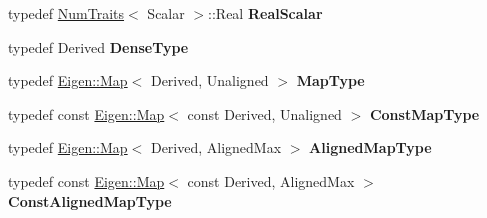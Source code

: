 \begin{DoxyCompactItemize}
\mbox{\label{class_eigen_1_1_plain_object_base_a48b2ce86692c75e066c80845b92798fc}} 
typedef \mbox{\hyperlink{struct_eigen_1_1_num_traits}{Num\+Traits}}$<$ Scalar $>$\+::Real {\bfseries Real\+Scalar}
\item 
\mbox{\label{class_eigen_1_1_plain_object_base_ac25403c3532dd011b8c0b490e5a2cfdc}} 
typedef Derived {\bfseries Dense\+Type}
\item 
\mbox{\label{class_eigen_1_1_plain_object_base_a079675be675be515402f37c3d73f7daf}} 
typedef \mbox{\hyperlink{class_eigen_1_1_map}{Eigen\+::\+Map}}$<$ Derived, Unaligned $>$ {\bfseries Map\+Type}
\item 
\mbox{\label{class_eigen_1_1_plain_object_base_af97b8d1ff458c804698bde148f03aa88}} 
typedef const \mbox{\hyperlink{class_eigen_1_1_map}{Eigen\+::\+Map}}$<$ const Derived, Unaligned $>$ {\bfseries Const\+Map\+Type}
\item 
\mbox{\label{class_eigen_1_1_plain_object_base_a0cc4ed7303f5f15f28b6ef0347931618}} 
typedef \mbox{\hyperlink{class_eigen_1_1_map}{Eigen\+::\+Map}}$<$ Derived, Aligned\+Max $>$ {\bfseries Aligned\+Map\+Type}
\item 
\mbox{\label{class_eigen_1_1_plain_object_base_a495e1fa482aa3c37be8a3d2b8bb7d666}} 
typedef const \mbox{\hyperlink{class_eigen_1_1_map}{Eigen\+::\+Map}}$<$ const Derived, Aligned\+Max $>$ {\bfseries Const\+Aligned\+Map\+Type}
\end{DoxyCompactItemize}

